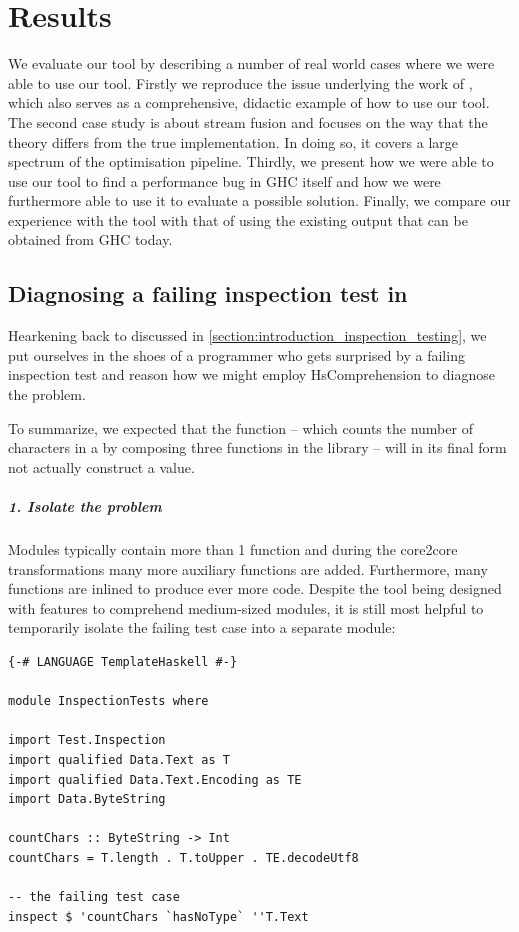 \chapter{Results}

We evaluate our tool by describing a number of real world cases where we were able to use our tool.
Firstly we reproduce the issue underlying the work of  \cite{inspection_testing}, which
also serves as a comprehensive, didactic example of how to use our tool.
The second case study is about stream fusion and focuses on the way that the theory differs from the true implementation.
In doing so, it covers a large spectrum of the optimisation pipeline.
Thirdly, we present how we were able to use our tool to find a performance bug in GHC itself and how we were furthermore
able to use it to evaluate a possible solution.
Finally, we compare our experience with the tool with that of using the existing output that can
be obtained from GHC today.

\section{Diagnosing a failing inspection test in }

Hearkening back to  discussed in \cref{section:introduction_inspection_testing}, we put
ourselves in the shoes of a programmer who gets surprised by a failing inspection test and reason how we might
employ HsComprehension to diagnose the problem. 

To summarize, we expected that the function  -- which counts the number of characters in a 
by composing three functions in the  library -- will in its final form not actually construct a  value.

\paragraph{1. Isolate the problem}
Modules typically contain more than 1 function and during the core2core transformations many more auxiliary functions are
added. Furthermore, many functions are inlined to produce ever more code. Despite the tool being designed with features to 
comprehend medium-sized modules, it is still most helpful to temporarily isolate the failing test case into a separate module:

\begin{verbatim}
{-# LANGUAGE TemplateHaskell #-}

module InspectionTests where

import Test.Inspection
import qualified Data.Text as T
import qualified Data.Text.Encoding as TE
import Data.ByteString

countChars :: ByteString -> Int
countChars = T.length . T.toUpper . TE.decodeUtf8

-- the failing test case
inspect $ 'countChars `hasNoType` ''T.Text
\end{verbatim}

